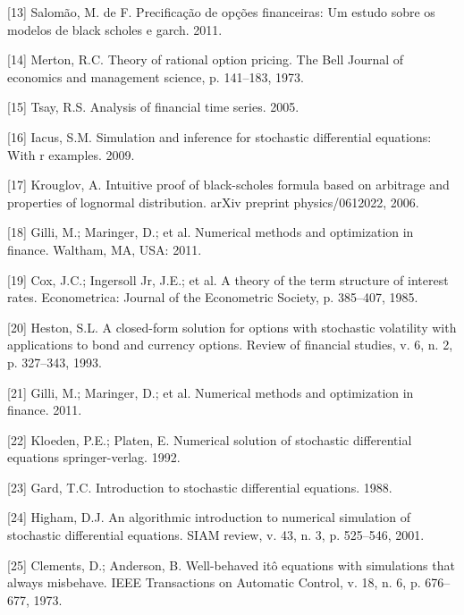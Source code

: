\documentclass[12pt,twoside]{reedthesis}
\theoremstyle{definition}
\theoremstyle{definition}
\theoremstyle{remark}
\begin{document}
  \hypertarget{ref-salomao2011precificaccao}{}
  {[}13{]} Salomão, M. de F. Precificação de opções financeiras: Um estudo
  sobre os modelos de black scholes e garch. 2011.
  
  \hypertarget{ref-merton1973theory}{}
  {[}14{]} Merton, R.C. Theory of rational option pricing. The Bell
  Journal of economics and management science, p. 141--183, 1973.
  
  \hypertarget{ref-tsay2005analysis}{}
  {[}15{]} Tsay, R.S. Analysis of financial time series. 2005.
  
  \hypertarget{ref-iacus2009simulation}{}
  {[}16{]} Iacus, S.M. Simulation and inference for stochastic
  differential equations: With r examples. 2009.
  
  \hypertarget{ref-krouglov2006intuitive}{}
  {[}17{]} Krouglov, A. Intuitive proof of black-scholes formula based on
  arbitrage and properties of lognormal distribution. arXiv preprint
  physics/0612022, 2006.
  
  \hypertarget{ref-nmof}{}
  {[}18{]} Gilli, M.; Maringer, D.; et al. Numerical methods and
  optimization in finance. Waltham, MA, USA: 2011.
  
  \hypertarget{ref-cox1985theory}{}
  {[}19{]} Cox, J.C.; Ingersoll Jr, J.E.; et al. A theory of the term
  structure of interest rates. Econometrica: Journal of the Econometric
  Society, p. 385--407, 1985.
  
  \hypertarget{ref-heston1993closed}{}
  {[}20{]} Heston, S.L. A closed-form solution for options with stochastic
  volatility with applications to bond and currency options. Review of
  financial studies, v. 6, n. 2, p. 327--343, 1993.
  
  \hypertarget{ref-gilli_numerical_2011}{}
  {[}21{]} Gilli, M.; Maringer, D.; et al. Numerical methods and
  optimization in finance. 2011.
  
  \hypertarget{ref-kloeden1992}{}
  {[}22{]} Kloeden, P.E.; Platen, E. Numerical solution of stochastic
  differential equations springer-verlag. 1992.
  
  \hypertarget{ref-gard1988}{}
  {[}23{]} Gard, T.C. Introduction to stochastic differential equations.
  1988.
  
  \hypertarget{ref-higham2001}{}
  {[}24{]} Higham, D.J. An algorithmic introduction to numerical
  simulation of stochastic differential equations. SIAM review, v. 43, n.
  3, p. 525--546, 2001.
  
  \hypertarget{ref-clements1973well}{}
  {[}25{]} Clements, D.; Anderson, B. Well-behaved itô equations with
  simulations that always misbehave. IEEE Transactions on Automatic
  Control, v. 18, n. 6, p. 676--677, 1973.
  
\end{document}
